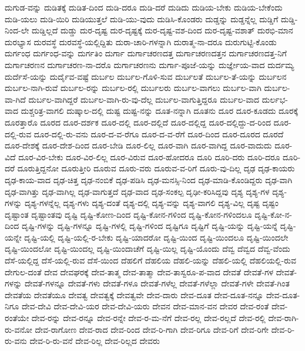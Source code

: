 {ದುಗುಡ-ವನ್ನು
ದುಡಿತಕ್ಕೆ
ದುಡಿತ-ದಿಂದ
ದುಡಿ-ದರೂ
ದುಡಿ-ದರೆ
ದುಡಿದು
ದುಡಿಯ-ಬೇಕು
ದುಡಿಯ-ಬೇಕೆಂದು
ದುಡಿ-ಯಲು
ದುಡಿ-ಯಿರಿ
ದುಡಿಯುತ್ತಲೆ
ದುಡಿ-ಯು-ವುದು
ದುಡಿಸಿ-ಕೊಂಡರು
ದುಡ್ಡನ್ನು
ದುಡ್ಡನ್ನೆಲ್ಲ
ದುಡ್ಡಿಗೆ
ದುಡ್ಡಿ-ನಿಂದ-ಲೇ
ದುಡ್ಡಿಲ್ಲದೆ
ದುಡ್ಡು
ದುರ-ದೃಷ್ಟ
ದುರ-ದೃಷ್ಟಕ್ಕೆ
ದುರ-ದೃಷ್ಟ-ವಶ-ದಿಂದ
ದುರ-ದೃಷ್ಟ-ವಶಾತ್
ದುರಭಿ-ಮಾನ
ದುರಭ್ಯಾಸ
ದುರವಸ್ಥೆ
ದುರವಸ್ಥೆ-ಯಲ್ಲಿದ್ದಿತು
ದುರಾ-ಚಾರಿ-ಗಳನ್ನಾಗಿ
ದುರಾತ್ಮ-ನಾ-ದರೂ
ದುರುಗುಟ್ಟಿ-ಕೊಂಡು
ದುರ್ಗಂಧ
ದುರ್ಗಂಧ-ವನ್ನು
ದುರ್ಗತಿಂ
ದುರ್ಗಾ
ದುರ್ಗಾಚರಣದತ್ತ
ದುರ್ಗಾಚರಣದತ್ತನ
ದುರ್ಗಾಚರಣದತ್ತ-ನಿಗೆ
ದುರ್ಗಾಚರಣನ
ದುರ್ಗಾಚರಣ-ನಾ-ದರೊ
ದುರ್ಗಾಚರಣನು
ದುರ್ಗಾ-ಪೂಜೆ-ಯನ್ನು
ದುರ್ಜ್ಞೇಯ-ವಾದ
ದುರ್ದಮ್ಯ
ದುರ್ದೆಸೆ-ಯನ್ನು
ದುರ್ದೈವ-ವಷ್ಟೆ
ದುರ್ಬಲ
ದುರ್ಬಲ-ಗೊಳಿ-ಸುವ
ದುರ್ಬಲತೆ
ದುರ್ಬಲ-ತೆ-ಯನ್ನು
ದುರ್ಬಲನ
ದುರ್ಬಲ-ನಾಗಿ-ರುವೆ
ದುರ್ಬಲ-ರನ್ನು
ದುರ್ಬಲ-ರಲ್ಲಿ
ದುರ್ಬಲರು
ದುರ್ಬಲ-ವಾಗಲು
ದುರ್ಬಲ-ವಾಗಿ
ದುರ್ಬಲ-ವಾ-ಗಿದೆ
ದುರ್ಬಲ-ವಾಗಿದ್ದರೆ
ದುರ್ಬಲ-ವಾಗಿ-ರು-ವು-ದೆಲ್ಲ
ದುರ್ಬಲ-ವಾಗುತ್ತಿದ್ದರೂ
ದುರ್ಬಲ-ವಾದ
ದುರ್ಲಭ-ವಾದ
ದುಶ್ಚರಿತ್ರ-ವಾಗಲಿ
ದುಷ್ಕಾಲ-ದಲ್ಲಿ
ದುಷ್ಟ
ದುಷ್ಟ-ನನ್ನು
ದೂತ-ನನ್ನಾಗಿ
ದೂತನು
ದೂರ
ದೂರ-ಕೂಡದು
ದೂರಕ್ಕೆ
ದೂರತ್ತಾರೊ
ದೂರದ
ದೂರ-ದರ್ಶಕ
ದೂರ-ದಲ್ಲಿ
ದೂರ-ದಲ್ಲಿದೆ
ದೂರ-ದಲ್ಲಿದ್ದ
ದೂರ-ದಲ್ಲಿದ್ದು-ದ-ರಿಂದ
ದೂರ-ದಲ್ಲಿ-ರುವ
ದೂರ-ದಲ್ಲಿ-ರು-ವನು
ದೂರ-ದ-ವ-ರೆಗೂ
ದೂರ-ದ-ವ-ರೆಗೆ
ದೂರ-ದಿಂದ
ದೂರ-ದೂರದ
ದೂರದೆ
ದೂರ-ದೇಶಕ್ಕೆ
ದೂರ-ದೇಶ-ದಿಂದ
ದೂರ-ಬೇಡಿ
ದೂರ-ಲಿಲ್ಲ
ದೂರ-ವಾಗಿ
ದೂರ-ವಾಗಿದ್ದ
ದೂರ-ವಾದುದು
ದೂರ-ವಿದೆ
ದೂರ-ವಿರ-ಬೇಕು
ದೂರ-ವಿರ-ಲಿಲ್ಲ
ದೂರ-ವಿರುವ
ದೂರ-ಹೋದರೂ
ದೂರಿ
ದೂರಿ-ದರು
ದೂರಿ-ದರೂ
ದೂರಿ-ದರೆ
ದೂರುತ್ತಿದ್ದನೋ
ದೂರುತ್ತೀರಿ
ದೂರುವ
ದೂರು-ವರು
ದೂರುವ-ವ-ರಿಗೆ
ದೂರು-ವು-ದಿಲ್ಲ
ದೃಢ
ದೃಢ-ಕಾಯರು
ದೃಢ-ಕಾಯ-ವಾದ
ದೃಢ-ಚಿತ್ತ
ದೃಢ-ನಂಬಿಕೆ
ದೃಢ-ಪಡಿಸಿ
ದೃಢ-ಮನಸ್ಸಿ-ನಿಂದ
ದೃಢ-ಮಾಡಿ-ಕೊಂಡಿದ್ದರು
ದೃಢ-ವಾಗಿ
ದೃಢ-ವಾಗಿತ್ತು
ದೃಢ-ವಾಗಿಲ್ಲ
ದೃಢ-ವಾಗುತ್ತದೆ
ದೃಢ-ವಾದ
ದೃಢ-ಸಂಕಲ್ಪ
ದೃಢೀ-ಕರಿಸಿದ್ದವು
ದೃಶ್ಯ
ದೃಶ್ಯ-ಗಳ
ದೃಶ್ಯ-ಗಳನ್ನು
ದೃಶ್ಯ-ಗಳನ್ನೆಲ್ಲ
ದೃಶ್ಯ-ಗಳು
ದೃಶ್ಯ-ದಂತೆ
ದೃಶ್ಯ-ದಲ್ಲಿ
ದೃಶ್ಯ-ವನ್ನು
ದೃಶ್ಯ-ವಾಗಲಿ
ದೃಶ್ಯ-ವಿಲ್ಲ
ದೃಷ್ಟ
ದೃಷ್ಟಂ
ದೃಷ್ಟಾಂತ
ದೃಷ್ಟಾಂತವು
ದೃಷ್ಟಿ
ದೃಷ್ಟಿ-ಕೋಣ-ದಿಂದ
ದೃಷ್ಟಿ-ಕೋನ-ಗಳಿಂದ
ದೃಷ್ಟಿ-ಕೋನ-ಗಳಿಂದಲೂ
ದೃಷ್ಟಿ-ಕೋ-ನ-ದಿಂದ
ದೃಷ್ಟಿ-ಗಳನ್ನು
ದೃಷ್ಟಿ-ಗಳನ್ನೂ
ದೃಷ್ಟಿ-ಗಳಲ್ಲಿ
ದೃಷ್ಟಿ-ಗಳಿಂದ
ದೃಷ್ಟಿಗೂ
ದೃಷ್ಟಿಗೆ
ದೃಷ್ಟಿ-ಯನ್ನು
ದೃಷ್ಟಿ-ಯನ್ನೆ
ದೃಷ್ಟಿ-ಯನ್ನೇ
ದೃಷ್ಟಿ-ಯಲ್ಲಿ
ದೃಷ್ಟಿ-ಯಲ್ಲಿ-ರ-ಬೇಕು
ದೃಷ್ಟಿ-ಯಾದರೋ
ದೃಷ್ಟಿ-ಯಿಂದ
ದೃಷ್ಟಿ-ಯಿಂದಲೂ
ದೃಷ್ಟಿ-ಯಿಂದಲೇ
ದೃಷ್ಟಿ-ಯಿಂದಲೋ
ದೃಷ್ಟಿ-ಯಿಂದಲ್ಲ
ದೃಷ್ಟಿ-ಯಿಂದಾಚೆಗೆ
ದೃಷ್ಟಿ-ಯಿಲ್ಲ
ದೃಷ್ಟಿ-ಯೊಂದು
ದೆವ್ವ
ದೆವ್ವದ
ದೆವ್ವ-ವೆಂದು
ದೆಸೆ-ಯಲ್ಲಿದ್ದ
ದೆಸೆ-ಯಲ್ಲಿ-ರುವ
ದೆಸೆ-ಯಿಂದ
ದೆಹಲಿಗೆ
ದೆಹಲಿಯ
ದೆಹಲಿ-ಯನ್ನು
ದೆಹಲಿ-ಯಲ್ಲಿ
ದೆಹಲಿಯಲ್ಲಿ-ರುವ
ದೇಗುಲ-ದಂತೆ
ದೇವ
ದೇವಘರಕ್ಕೆ
ದೇವ-ತಾತ್ಮ
ದೇವ-ತಾತ್ಮಾ
ದೇವ-ತಾಸ್ವರೂ-ಪ-ವಾದ
ದೇವತೆ
ದೇವತೆ-ಗಳ
ದೇವತೆ-ಗಳನ್ನು
ದೇವತೆ-ಗಳನ್ನೂ
ದೇವತೆ-ಗಳು
ದೇವತೆ-ಗಳೂ
ದೇವತೆ-ಗಳೆಲ್ಲ
ದೇವತೆ-ಗಳೆಲ್ಲಾ
ದೇವತೆ-ಗಳೇ
ದೇವತೆ-ಗಿಂತ
ದೇವತೆಯ
ದೇವತೆಯೂ
ದೇವತ್ವ
ದೇವತ್ವಕ್ಕೆ
ದೇವತ್ವವೇ
ದೇವ-ದಾರು
ದೇವ-ದೂತ
ದೇವ-ದೂತ-ನನ್ನೂ
ದೇವ-ದೂತ-ನಿಗೂ
ದೇವ-ದೇವಿ
ದೇವ-ದೇವಿ-ಯರ
ದೇವ-ದೇವಿ-ಯರು
ದೇವನ
ದೇವ-ಮಾನ-ವನ
ದೇವರ
ದೇವ-ರಂತೆ
ದೇವ-ರಂತೆಯೇ
ದೇವ-ರನ್ನು
ದೇವ-ರನ್ನೂ
ದೇವ-ರನ್ನೇ
ದೇವ-ರ-ಮ-ನೆಗೆ
ದೇವ-ರಲ್ಲ
ದೇವ-ರಲ್ಲದೆ
ದೇವ-ರಲ್ಲಿ
ದೇವ-ರಾಗಿ-ರು-ವನೋ
ದೇವ-ರಾಗೋಣ
ದೇವ-ರಾದ
ದೇವ-ರಿಂದ
ದೇವ-ರಿ-ಗಾಗಿ
ದೇವ-ರಿಗೂ
ದೇವ-ರಿಗೆ
ದೇವ-ರಿಗೇ
ದೇವ-ರಿ-ರು-ವನು
ದೇವ-ರಿ-ರು-ವನೆ
ದೇವ-ರಿಲ್ಲ
ದೇವ-ರಿಲ್ಲದ
ದೇವರು
}
